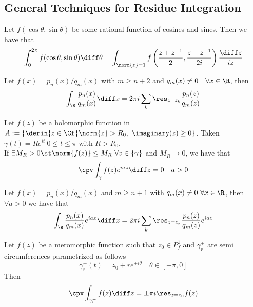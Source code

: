 \documentclass[../mmf.tex]{subfiles}
\begin{document}
\subsection{General Techniques for Residue Integration}
\begin{thm}
	Let $f(\cos\theta,\sin\theta)$ be some rational function of cosines and sines. Then we have that
	\begin{equation}
		\int_{0}^{2\pi}f(\cos\theta,\sin\theta)\diff\theta=\int_{\norm{z}=1}^{}f\left( \frac{z+z^{-1}}{2},\frac{z-z^{-1}}{2i} \right)\frac{\diff z}{iz}
		\label{eq:trigint}
	\end{equation}
\end{thm}
\begin{thm}
	Let $f(x)=p_n(x)/q_m(x)$ with $m\ge n+2$ and $q_m(x)\ne0\quad\forall x\in\R$, then
	\begin{equation}
		\int_{\R}^{}\frac{p_n(x)}{q_m(x)}\diff x=2\pi i\sum_{k}\res_{z=z_k}\frac{p_n(z)}{q_m(z)}
		\label{eq:rationalfunc}
	\end{equation}
\end{thm}
\begin{lem}
	Let $f(z)$ be a holomorphic function in $A:=\left\{ \derin{z\in\Cf}\norm{z}>R_0,\ \imaginary(z)\ge0 \right\}$. Taken $\gamma(t)=Re^{it}\ 0\le t\le\pi$ with $R>R_0$.\\
	If $\exists M_R>0\st\norm{f(z)}\le M_R\ \forall z\in\{\gamma\}$ and $M_R\to0$, we have that
	\begin{equation}
		\cpv\int_{\gamma}^{}f(z)e^{iaz}\diff z=0\quad a>0
		\label{eq:jordanlemma}
	\end{equation}
\end{lem}
\begin{thm}
	Let $f(x)=p_n(x)/q_m(x)$ and $m\ge n+1$ with $q_m(x)\ne0\ \forall x\in\R$, then $\forall a>0$ we have that
	\begin{equation}
		\int_{\R}^{}\frac{p_n(x)}{q_m(x)}e^{iax}\diff x=2\pi i\sum_k\res_{z=z_k}\frac{p_n(z)}{q_m(z)}e^{iaz}
		\label{eq:fracfourierint}
	\end{equation}
\end{thm}
\begin{lem}
	Let $f(z)$ be a meromorphic function such that $z_0\in P^1_f$ and $\gamma_r^{\pm}$ are semi circumferences parametrized as follows
	\begin{equation*}
		\gamma_r^{\pm}(t)=z_0+re^{\pm i\theta}\quad\theta\in[-\pi,0]
	\end{equation*}
	Then
	\begin{equation}
		\cpv\int_{\gamma_r^\pm}^{}f(z)\diff z=\pm\pi i\res_{z=z_0}f(z)
		\label{eq:singlesimplepole}
	\end{equation}
\end{lem}
\end{document}
